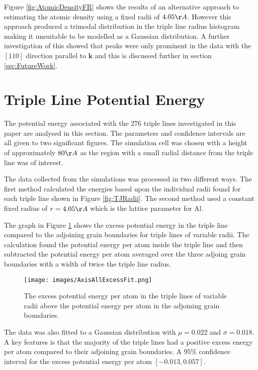 \documentclass[12pt,a4paper]{book}
\begin{document}
Figure \ref{fig:AtomicDensityFR} shows the results of an alternative approach to estimating the atomic density using a fixed radii of $4.05 \AA$. However this approach produced a trimodal distribution in the triple line radius histogram making it unsuitable to be modelled as a Gaussian distribution. A further investigation of this showed that peaks were only prominent in the data with the $[110]$ direction parallel to $\mathbf{k}$ and this is discussed further in section \ref{sec:FutureWork}. 



\newpage
\section{Triple Line Potential Energy}

The potential energy associated with the 276 triple lines investigated in this paper are analysed in this section. The parameters and confidence intervals are all given to two significant figures. The simulation cell was chosen with a height of approximately $80\AA$ as the region with a small radial distance from the triple line was of interest. 

The data collected from the simulations was processed in two different ways. The first method calculated the energies based upon the individual radii found for each triple line shown in Figure \ref{fig:TJRadii}. The second method used a constant fixed radius of $r = 4.05 \AA$ which is the lattice parameter for Al. 

The graph in Figure \ref{fig:ExcessPEVR} shows the excess potential energy in the triple line compared to the adjoining grain boundaries for triple lines of variable radii. The calculation found the potential energy per atom inside the triple line and then subtracted the potential energy per atom averaged over the three adjoing grain boundaries with a width of twice the triple line radius. 
 

\begin{figure}[H]
	\texttt{[image: images/AxisAllExcessFit.png]}
	\label{fig:ExcessPEVR}
	\caption{The excess potential energy per atom in the triple lines of variable radii above the potential energy per atom in the adjoining grain boundaries.} 
\end{figure}

The data was also fitted to a Gaussian distribution with $\mu = 0.022$ and $\sigma = 0.018$. A key features is that the majority of the triple lines had a positive excess energy per atom compared to their adjoining grain boundaries. A $95\%$ confidence interval for the excess potential energy per atom
$[-0.013, 0.057]$.
\end{document}

